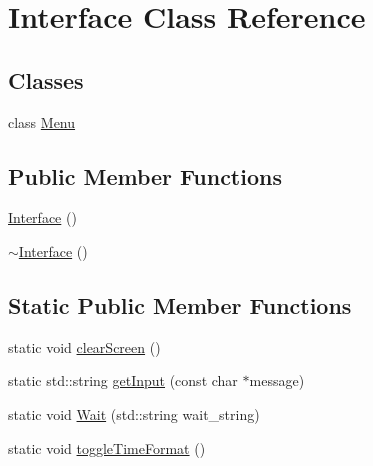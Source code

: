 \hypertarget{classInterface}{\section{Interface Class Reference}
\label{classInterface}
}
\subsection*{Classes}
\begin{DoxyCompactItemize}
\item 
class \hyperlink{classInterface_1_1Menu}{Menu}
\end{DoxyCompactItemize}
\subsection*{Public Member Functions}
\begin{DoxyCompactItemize}
\item 
\hyperlink{classInterface_a4406d74c75bdfe150bf72be1f1cda8b1}{Interface} ()
\item 
\hyperlink{classInterface_a19179888f29f18f1be54a3dfe98f68c0}{$\sim$\-Interface} ()
\end{DoxyCompactItemize}
\subsection*{Static Public Member Functions}
\begin{DoxyCompactItemize}
\item 
static void \hyperlink{classInterface_af92bb2aeecc6a19095af23fa78b49451}{clear\-Screen} ()
\item 
static std\-::string \hyperlink{classInterface_aa5c0539404373d488986f030f7a84a6f}{get\-Input} (const char $\ast$message)
\item 
static void \hyperlink{classInterface_ab235ba2f0184e3fbfd5d5a64d5eb85ef}{Wait} (std\-::string wait\-\_\-string)
\item 
static void \hyperlink{classInterface_a2e002e61dc11cf4a1bd9c039704194df}{toggle\-Time\-Format} ()
\end{DoxyCompactItemize}


